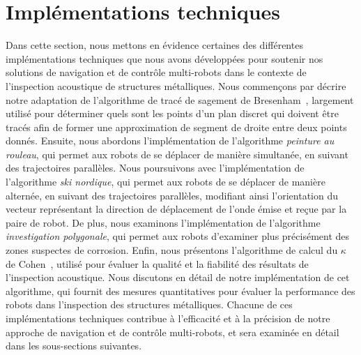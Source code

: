 \documentclass[francais,RandD]{rapportPFE}
\begin{document}
	\section{Implémentations techniques}
		Dans cette section, nous mettons en évidence certaines des différentes implémentations techniques que nous avons développées pour soutenir nos solutions de navigation et de contrôle multi-robots dans le contexte de l'inspection acoustique de structures métalliques.
		Nous commençons par décrire notre adaptation de l'algorithme de tracé de sagement de Bresenham~\cite{enwiki:1155124335}, largement utilisé pour déterminer quels sont les points d'un plan discret qui doivent être tracés afin de former une approximation de segment de droite entre deux points donnés.
		Ensuite, nous abordons l'implémentation de l'algorithme \textit{peinture au rouleau}, qui permet aux robots de se déplacer de manière simultanée, en suivant des trajectoires parallèles.
		Nous poursuivons avec l'implémentation de l'algorithme \textit{ski nordique}, qui permet aux robots de se déplacer de manière alternée, en suivant des trajectoires parallèles, modifiant ainsi l'orientation du vecteur représentant la direction de déplacement de l'onde émise et reçue par la paire de robot.
		De plus, nous examinons l'implémentation de l'algorithme \textit{investigation polygonale}, qui permet aux robots d'examiner plus précisément des zones suspectes de corrosion.
		Enfin, nous présentons l'algorithme de calcul du $\kappa$ de Cohen~\cite{enwiki:1130024730}, utilisé pour évaluer la qualité et la fiabilité des résultats de l'inspection acoustique.
		Nous discutons en détail de notre implémentation de cet algorithme, qui fournit des mesures quantitatives pour évaluer la performance des robots dans l'inspection des structures métalliques.
		Chacune de ces implémentations techniques contribue à l'efficacité et à la précision de notre approche de navigation et de contrôle multi-robots, et sera examinée en détail dans les sous-sections suivantes.
\end{document}

